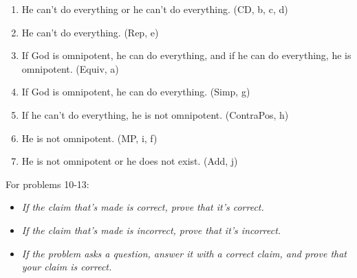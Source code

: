 \documentclass{article}
\begin{document}
\begin{enumerate}
\begin{enumerate}
              \item He can't do everything or he can't do everything. (CD, b, c, d)
              \item He can't do everything. (Rep, e)
              \item If God is omnipotent, he can do everything, and if he can do everything, he is omnipotent. (Equiv, a)
              \item If God is omnipotent, he can do everything. (Simp, g)
              \item If he can't do everything, he is not omnipotent. (ContraPos, h)
              \item He is not omnipotent. (MP, i, f)
              \item He is not omnipotent or he does not exist. (Add, j)
          \end{enumerate}
\end{enumerate}

\begin{flushleft}
    For problems 10-13:
\end{flushleft}
\begin{itemize}
    \item \textit{If the claim that's made is correct, prove that it's correct.}
    \item \textit{If the claim that's made is incorrect, prove that it's incorrect.}
    \item \textit{If the problem asks a question, answer it with a correct claim, and prove that your claim is correct.}
\end{itemize}
\end{document}
